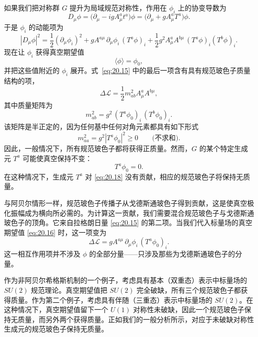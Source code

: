 如果我们把对称群 $G$ 提升为局域规范对称性，作用在 $\phi_i$ 上的协变导数为
\begin{equation}
  D_\mu\phi = \bigl( \partial_\mu - igA^a_\mu t^a \bigr)\phi
  = \bigl( \partial_\mu + gA^a_\mu T^a \bigr)\phi .
  \label{eq:20.15}
\end{equation}
于是 $\phi_i$ 的动能项为
\begin{equation}
  |D_\mu\phi|^2 = \frac{1}{2}(\partial_\mu\phi_i)^2
    + gA^{a\mu}\,\partial_\mu\phi_i\,(T^a\phi)_i
    + \frac{1}{2}g^2A^a_\mu A^{b\mu}\,(T^a\phi)_i(T^b\phi)_i .
\end{equation}
现在让 $\phi_i$ 获得真空期望值
\begin{equation}
  \langle\phi\rangle = \phi_0 ,
  \label{eq:20.16}
\end{equation}
并把这些值附近的 $\phi_i$ 展开。式~\eqref{eq:20.15} 中的最后一项含有具有规范玻色子质量结构的项，
\begin{equation}
  \Delta\mathcal{L} = \frac{1}{2}m^2_{ab}A^a_\mu A^{b\mu} ,
  \label{eq:20.17}
\end{equation}
其中质量矩阵为
\begin{equation}
  m^2_{ab} = g^2\,(T^a\phi_0)_i\,(T^b\phi_0)_i .
  \label{eq:20.18}
\end{equation}
该矩阵是半正定的，因为任何基中任何对角元素都具有如下形式
\begin{equation}
  m^2_{aa} = g^2|T^a\phi_0|^2 \ge 0 \qquad \text{(不求和)} .
\end{equation}
因此，一般情况下，所有规范玻色子都将获得正质量。然而，$G$ 的某个特定生成元 $T^a$ 可能使真空保持不变：
\begin{equation}
  T^a\phi_0 = 0 .
\end{equation}
在这种情况下，生成元 $T^a$ 对 \eqref{eq:20.18} 没有贡献，相应的规范玻色子将保持无质量。

与阿贝尔情形一样，规范玻色子传播子从戈德斯通玻色子得到贡献，这是使真空极化振幅成为横向所必需的。为计算这一贡献，我们需要混合规范玻色子与戈德斯通玻色子的顶角。它来自拉格朗日量 \eqref{eq:20.15} 的第二项。当我们代入标量场的真空期望值 \eqref{eq:20.16} 时，这一项变为
\begin{equation}
  \Delta\mathcal{L} = gA^{a\mu}\,\partial_\mu\phi_i\,(T^a\phi_0)_i .
  \label{eq:20.19}
\end{equation}
这一相互作用项并不涉及 $\phi$ 的全部分量——只涉及那些为戈德斯通玻色子的分量。

作为非阿贝尔希格斯机制的一个例子，考虑具有基本（双重态）表示中标量场的 $SU(2)$ 规范理论。真空期望值把 $SU(2)$ 完全破缺，所有三个规范玻色子都获得质量。作为第二个例子，考虑具有伴随（三重态）表示中标量场的 $SU(2)$。在这种情况下，真空期望值留下一个 $U(1)$ 对称性未破缺，因此一个规范玻色子保持无质量，而另外两个获得质量。正如我们的一般分析所示，对应于未破缺对称性生成元的规范玻色子保持无质量。

